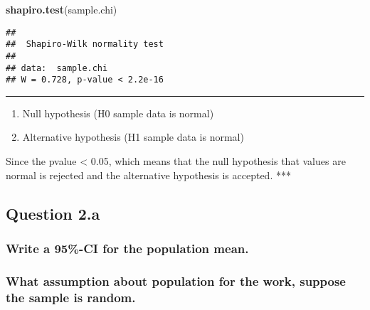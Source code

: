 \documentclass[
]{article}
\newenvironment{Shaded}{\begin{snugshade}}{\end{snugshade}}
\newcommand{\KeywordTok}[1]{\textcolor[rgb]{0.13,0.29,0.53}{\textbf{#1}}}
\newcommand{\NormalTok}[1]{#1}
\begin{document}
\begin{Shaded}
\begin{Highlighting}[]
\KeywordTok{shapiro.test}\NormalTok{(sample.chi)}
\end{Highlighting}
\end{Shaded}

\begin{verbatim}
## 
##  Shapiro-Wilk normality test
## 
## data:  sample.chi
## W = 0.728, p-value < 2.2e-16
\end{verbatim}

\begin{center}\rule{0.5\linewidth}{0.5pt}\end{center}

\begin{enumerate}
\def\labelenumi{\arabic{enumi}.}
\item
  Null hypothesis (H0 sample data is normal)
\item
  Alternative hypothesis (H1 sample data is normal)
\end{enumerate}

Since the pvalue \textless{} 0.05, which means that the null hypothesis
that values are normal is rejected and the alternative hypothesis is
accepted. ***

\hypertarget{question-2.a}{%
\subsection{Question 2.a}\label{question-2.a}}

\hypertarget{write-a-95-ci-for-the-population-mean.}{%
\subsubsection{Write a 95\%-CI for the population
mean.}\label{write-a-95-ci-for-the-population-mean.}}

\hypertarget{what-assumption-about-population-for-the-work-suppose-the-sample-is-random.}{%
\subsubsection{What assumption about population for the work, suppose
the sample is
random.}\label{what-assumption-about-population-for-the-work-suppose-the-sample-is-random.}}
\end{document}
